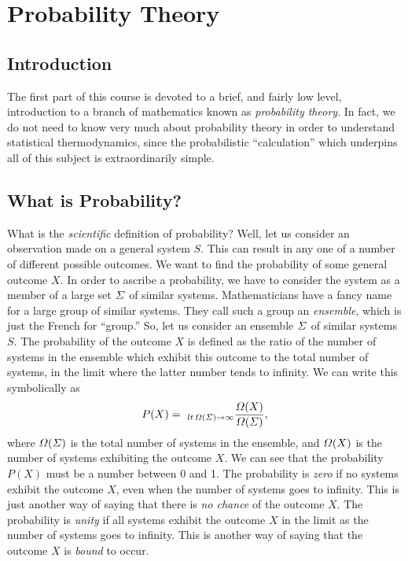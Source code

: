\chapter{Probability Theory}\label{s2}

\section{Introduction}
The first part of this course is devoted to a brief, and
fairly low level, introduction to a branch of mathematics known as
{\em probability theory}.
In fact, we do not need  to know very much about probability
theory in order to understand statistical thermodynamics, since the
probabilistic ``calculation'' which underpins all of this subject
is extraordinarily simple.  

\section{What is Probability?}
What is the {\em scientific}
 definition of probability? Well, let us consider
an observation made on a general system $S$. This can result in 
 any one of a number
of different possible outcomes. We want to find the probability of
some general outcome $X$. In order to ascribe a probability, we have to
consider the system as a member of a large set ${\mit\Sigma}$  
of similar systems.
Mathematicians have a fancy name for a large 
group of similar systems. They call such a group an {\em ensemble}, which is
just the French for ``group.'' So, let us consider an ensemble ${\mit\Sigma}$ of 
similar systems $S$. The probability of the outcome $X$ is defined as the
ratio of the number of systems in the ensemble which exhibit this outcome
to the total number of systems, in the limit where the latter
number tends to
infinity. We can write this symbolically as
\begin{equation}
P(X) = ~_{lt\,{\mit\Omega}({\mit\Sigma})\rightarrow\infty}\frac{{\mit\Omega}(X)}{{\mit\Omega}({\mit\Sigma})},
\end{equation}
where ${\mit\Omega}({\mit\Sigma})$ is the total number of systems in the ensemble, 
and ${\mit\Omega}(X)$ is the
number of systems exhibiting the outcome $X$. We can see that the probability
$P(X)$ must be a number between 0 and 1. The probability is {\em zero}\/ if no
systems exhibit the outcome $X$, even when the number of systems goes to 
infinity. This is just another way of saying that there is {\em no chance}\/
 of the
outcome $X$. The probability is {\em unity}\/ if all systems exhibit the outcome
$X$ in the limit as the number of systems goes to infinity. This is another
way of saying that the outcome $X$ is {\em bound}\/ to occur.

